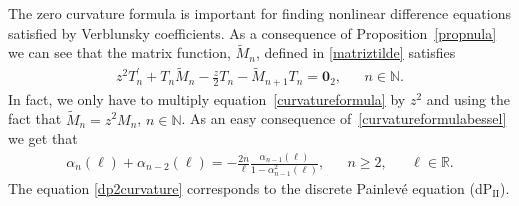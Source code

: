 \documentclass[12pt]{amsart}
\newtheorem{corollary}{Corollary}[section]
\begin{document}
The zero curvature formula is important for finding nonlinear difference equations satisfied by Verblunsky coefficients.
As a consequence of Proposition~\ref{propnula} we can see that
the matrix function, \( \widetilde{M}_n \), defined in \eqref{matriztilde} satisfies
\begin{align}\label{curvatureformulabessel}
z^2T_n^\prime +T_n\widetilde{M}_n-\frac{z}{2}T_n-\widetilde{M}_{n+1}T_n=
\mathbf{0}_{2} ,
&& n \in \mathbb N .
\end{align}
In fact,
we only have to multiply equation~\eqref{curvatureformula} by \( z^2 \) and using the fact that \( \widetilde M_n = z^2 M_n \), \( n \in \mathbb N \).
As an easy consequence of~\eqref{curvatureformulabessel} we get that
\begin{align}\label{dp2curvature}
\alpha_{n}(\ell) + \alpha_{n-2}(\ell) = -\frac{2n}{ \ell } \frac{\alpha_{n-1}(\ell)}{1-\alpha_{n-1}^2(\ell)}, && n \geqslant 2,
&& \ell \in \mathbb R .
\end{align}
The equation \eqref{dp2curvature} corresponds to the discrete Painlev\'e equation (dP\(_{\mbox{II}} \)).
\end{document}
